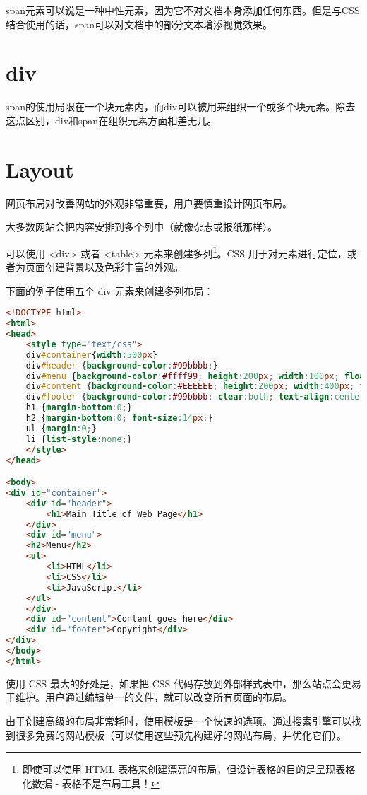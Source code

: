 span元素可以说是一种中性元素，因为它不对文档本身添加任何东西。但是与CSS结合使用的话，span可以对文档中的部分文本增添视觉效果。


\section{div}

span的使用局限在一个块元素内，而div可以被用来组织一个或多个块元素。除去这点区别，div和span在组织元素方面相差无几。




\section{Layout}


网页布局对改善网站的外观非常重要，用户要慎重设计网页布局。

大多数网站会把内容安排到多个列中（就像杂志或报纸那样）。

可以使用 <div> 或者 <table> 元素来创建多列\footnote{即使可以使用 HTML 表格来创建漂亮的布局，但设计表格的目的是呈现表格化数据 - 表格不是布局工具！}。CSS 用于对元素进行定位，或者为页面创建背景以及色彩丰富的外观。

下面的例子使用五个 div 元素来创建多列布局：

\begin{lstlisting}[language=HTML]
<!DOCTYPE html>
<html>
<head>
	<style type="text/css">
	div#container{width:500px}
	div#header {background-color:#99bbbb;}
	div#menu {background-color:#ffff99; height:200px; width:100px; float:left;}
	div#content {background-color:#EEEEEE; height:200px; width:400px; float:left;}
	div#footer {background-color:#99bbbb; clear:both; text-align:center;}
	h1 {margin-bottom:0;}
	h2 {margin-bottom:0; font-size:14px;}
	ul {margin:0;}
	li {list-style:none;}
	</style>
</head>

<body>
<div id="container">
	<div id="header">
		<h1>Main Title of Web Page</h1>
	</div>
	<div id="menu">
	<h2>Menu</h2>
	<ul>
		<li>HTML</li>
		<li>CSS</li>
		<li>JavaScript</li>
	</ul>
	</div>
	<div id="content">Content goes here</div>
	<div id="footer">Copyright</div>
</div>
</body>
</html>
\end{lstlisting}

使用 CSS 最大的好处是，如果把 CSS 代码存放到外部样式表中，那么站点会更易于维护。用户通过编辑单一的文件，就可以改变所有页面的布局。

由于创建高级的布局非常耗时，使用模板是一个快速的选项。通过搜索引擎可以找到很多免费的网站模板（可以使用这些预先构建好的网站布局，并优化它们）。


